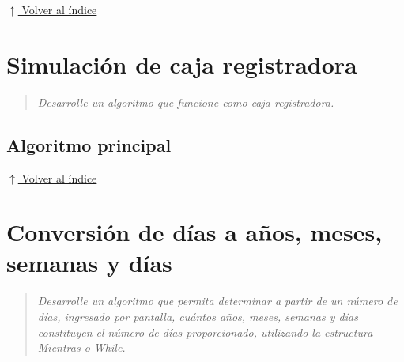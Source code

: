 \documentclass[12pt]{article}
\newcommand{\pseudocodigo}[2]{%
}
\newcommand{\volverindice}{%
    \vspace{1em}%
    \begin{flushright}%
        \hyperlink{indice}{\small $\uparrow$ Volver al índice}%
    \end{flushright}%
}
\newcommand{\enunciado}[1]{%
    \begin{quote}
        \itshape #1
    \end{quote}
}
\begin{document}



\volverindice
\newpage


\section{Simulación de caja registradora}

\enunciado{Desarrolle un algoritmo que funcione como caja registradora.}

\subsection{Algoritmo principal}

\pseudocodigo{ej14_caja_registradora}{Caja registradora}





\volverindice
\newpage


\section{Conversión de días a años, meses, semanas y días}

\enunciado{Desarrolle un algoritmo que permita determinar a partir de un número de días, ingresado por pantalla, cuántos años, meses, semanas y días constituyen el número de días proporcionado, utilizando la estructura Mientras o While.}
\end{document}
